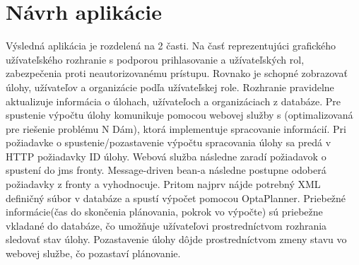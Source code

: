 \section{Návrh aplikácie}
Výsledná aplikácia je rozdelená na 2 časti. Na časť reprezentujúci grafického užívateľského rozhranie s podporou prihlasovanie a užívateľských rol, zabezpečenia proti neautorizovanému prístupu. Rovnako je schopné zobrazovať úlohy, užívateľov a organizácie podľa užívateľskej role. Rozhranie pravidelne aktualizuje informácia o úlohach, užívateľoch a organizáciach z databáze. Pre spustenie výpočtu úlohy komunikuje pomocou webovej služby s (optimalizovaná pre riešenie problému N Dám), ktorá implementuje spracovanie informácií. Pri požiadavke o spustenie/pozastavenie výpočtu spracovania úlohy sa predá v HTTP požiadavky ID úlohy. Webová služba následne zaradí požiadavok o spustení do jms fronty. Message-driven bean-a následne postupne odoberá požiadavky z fronty a vyhodnocuje. Pritom najprv nájde potrebný XML definičný súbor v databáze a spustí výpočet pomocou OptaPlanner. Priebežné informácie(čas do skončenia plánovania, pokrok vo výpočte) sú priebežne vkladané do databáze, čo umožňuje užívateľovi prostredníctvom rozhrania sledovať stav úlohy. Pozastavenie úlohy dôjde prostredníctvom zmeny stavu vo webovej službe, čo pozastaví plánovanie.



